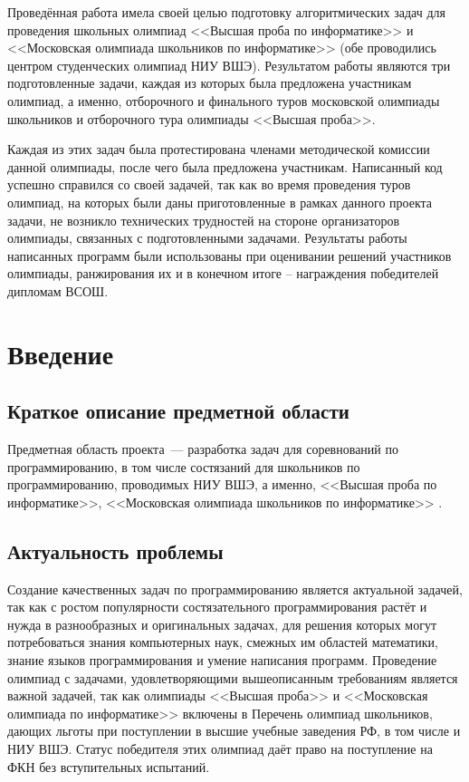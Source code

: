 \documentclass[a4paper]{article}
\begin{document}
Проведённая работа имела своей целью подготовку алгоритмических задач для проведения школьных олимпиад <<Высшая проба по информатике>> и <<Московская олимпиада школьников по информатике>> (обе проводились центром студенческих олимпиад НИУ ВШЭ). Результатом работы являются три подготовленные задачи, каждая из которых была предложена участникам олимпиад, а именно, отборочного и финального туров московской олимпиады школьников и отборочного тура олимпиады <<Высшая проба>>. 

Каждая из этих задач была протестирована членами методической комиссии данной олимпиады, после чего была предложена участникам. Написанный код успешно справился со своей задачей, так как во время проведения туров олимпиад, на которых были даны приготовленные в рамках данного проекта задачи, не возникло технических трудностей на стороне организаторов олимпиады, связанных с подготовленными задачами. Результаты работы написанных программ были использованы при оценивании решений участников олимпиады, ранжирования их и в конечном итоге -- награждения победителей дипломам ВСОШ.


\newpage

\tableofcontents


\newpage

\section{Введение}

\subsection{Краткое описание предметной области}

Предметная область проекта~--- разработка задач для соревнований по программированию, в том числе состязаний для школьников по программированию, проводимых НИУ ВШЭ, а именно, <<Высшая проба по информатике>>, <<Московская олимпиада школьников по информатике>> .

\subsection{Актуальность проблемы}

Создание качественных задач по программированию является актуальной задачей, так как с ростом популярности состязательного программирования растёт и нужда в разнообразных и оригинальных задачах, для решения которых могут потребоваться знания компьютерных наук, смежных им областей математики, знание языков программирования и умение написания программ.
Проведение олимпиад с задачами, удовлетворяющими вышеописанным требованиям является важной задачей, так как олимпиады <<Высшая проба>> и <<Московская олимпиада по информатике>> включены в Перечень олимпиад школьников, дающих льготы при поступлении в высшие учебные заведения РФ, в том числе и НИУ ВШЭ. Статус победителя этих олимпиад даёт право на поступление на ФКН без вступительных испытаний.
\end{document}
